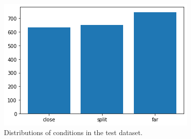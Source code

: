 \begin{figure}[hbt!]
\centering
\includegraphics[width=\columnwidth]{assets/testset_conditions.png}
\caption[Test dataset words]
{Distributions of conditions in the test dataset.}
\label{figure:testset-conditions}
\end{figure}
